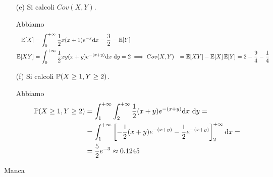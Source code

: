 \begin{enumerate}
\item [(e)] Si calcoli $Cov(X,Y)$.

Abbiamo
\begin{gather*}
\begin{aligned}
\mathbb{E}[X]&=\int_{0}^{+\infty} \frac{1}{2}x(x+1)e^{-x}\mathrm{d} x=\frac{3}{2}=\mathbb{E}[Y] \\
\mathbb{E}[XY]&=\int_{0}^{+\infty} \frac{1}{2}xy(x+y)e^{-(x+y)}\mathrm{d} x\ \mathrm{d} y=2
\implies Cov(X,Y)&=\mathbb{E}[XY]-\mathbb{E}[X]\,\mathbb{E}[Y]=2-\frac{9}{4}-\frac{1}{4}
\end{aligned}
\end{gather*}

\item [(f)] Si calcoli $\mathbb{P}(X\geq 1,Y\geq 2)$.

Abbiamo
\begin{gather*}
\begin{aligned}
\mathbb{P}(X\geq 1,Y\geq 2)&=\int_1^{+\infty}\int_2^{+\infty} \frac{1}{2}(x+y)e^{-(x+y)}\mathrm{d} x\ \mathrm{d} y=\\
&=\int_1^{+\infty}\left[-\frac{1}{2}(x+y)e^{-(x+y)}-\frac{1}{2}e^{-(x+y)}  \right]_2^{+\infty}\mathrm{d} x=\\
&=\frac{5}{2}e^{-3}\approx 0.1245
\end{aligned}
\end{gather*}

\end{enumerate}

\Soluzione{}
Manca

